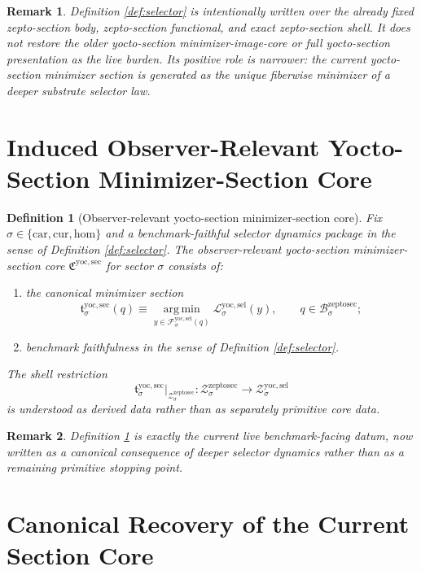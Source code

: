 \documentclass[11pt]{article}
\newcommand{\Car}{\mathrm{car}}
\newcommand{\Cur}{\mathrm{cur}}
\newcommand{\Hom}{\mathrm{hom}}
\newcommand{\ZeptoSectionBody}[1]{\mathcal B_{#1}^{\mathrm{zeptosec}}}
\newcommand{\ZeptoSectionShell}[1]{\mathcal Z_{#1}^{\mathrm{zeptosec}}}
\newcommand{\YoctoMinSectionCore}{\mathfrak C^{\mathrm{yoc,sec}}}
\newcommand{\YoctoMinSection}[1]{\mathfrak t_{#1}^{\mathrm{yoc,sec}}}
\newcommand{\YoctoSelectorFiber}[2]{\mathcal F_{#1}^{\mathrm{yoc,sel}}(#2)}
\newcommand{\YoctoSelectorFunctional}[1]{\mathscr L_{#1}^{\mathrm{yoc,sel}}}
\newcommand{\YoctoSelectorShell}[1]{\mathcal Z_{#1}^{\mathrm{yoc,sel}}}
\newtheorem{definition}{Definition}
\newtheorem{remark}{Remark}
\begin{document}
\begin{remark}
Definition \ref{def:selector} is intentionally written over the already fixed zepto-section body, zepto-section functional, and exact zepto-section shell. It does not restore the older yocto-section minimizer-image-core or full yocto-section presentation as the live burden. Its positive role is narrower: the current yocto-section minimizer section is generated as the unique fiberwise minimizer of a deeper substrate selector law.
\end{remark}

\section{Induced Observer-Relevant Yocto-Section Minimizer-Section Core}

\begin{definition}[Observer-relevant yocto-section minimizer-section core]
\label{def:sectioncore}
Fix \(\sigma\in\{\Car,\Cur,\Hom\}\) and a benchmark-faithful selector dynamics package in the sense of Definition \ref{def:selector}. The \emph{observer-relevant yocto-section minimizer-section core} \(\YoctoMinSectionCore\) for sector \(\sigma\) consists of:
\begin{enumerate}
    \item the canonical minimizer section
    \[
    \YoctoMinSection{\sigma}(q)
    \equiv
    \operatorname*{arg\,min}_{y\in\YoctoSelectorFiber{\sigma}{q}}
    \YoctoSelectorFunctional{\sigma}(y),
    \qquad
    q\in\ZeptoSectionBody{\sigma};
    \]
    \item benchmark faithfulness in the sense of Definition \ref{def:selector}.
\end{enumerate}
The shell restriction
\[
\YoctoMinSection{\sigma}\big|_{\ZeptoSectionShell{\sigma}}
:
\ZeptoSectionShell{\sigma}\to\YoctoSelectorShell{\sigma}
\]
is understood as derived data rather than as separately primitive core data.
\end{definition}

\begin{remark}
Definition \ref{def:sectioncore} is exactly the current live benchmark-facing datum, now written as a canonical consequence of deeper selector dynamics rather than as a remaining primitive stopping point.
\end{remark}

\section{Canonical Recovery of the Current Section Core}
\end{document}
